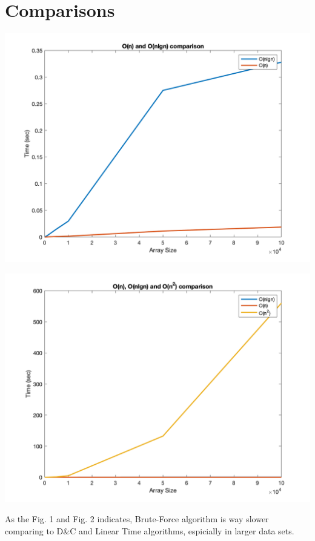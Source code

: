 \documentclass[twocolumns]{IEEEtran}
\begin{document}
\section{Comparisons}
\begin{center}
	\includegraphics[scale=0.25]{n_nlgn.png}\label{n}
	
	\includegraphics[scale=.25]{n_nlgn_n2.png}\label{n2}
\end{center}
As the Fig. 1 and Fig. 2 indicates, Brute-Force algorithm is way slower comparing to D\&C and Linear Time algorithms, espicially in larger data sets. 
\end{document}
